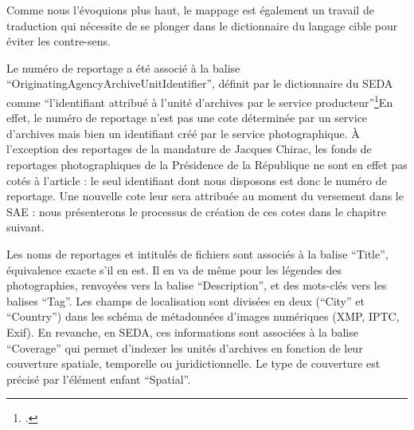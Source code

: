 Comme nous l'évoquions plus haut, le mappage est également un travail de traduction qui nécessite de se plonger dans le dictionnaire du langage cible pour éviter les contre-sens. 

Le numéro de reportage a été associé à la balise \enquote{OriginatingAgencyArchiveUnitIdentifier}, définit par le dictionnaire du SEDA comme \enquote{l'identifiant attribué à l’unité d’archives par le service producteur}\footcite{siafseda}En effet, le numéro de reportage n'est pas une cote déterminée par un service d'archives mais bien un identifiant créé par le service photographique. À l'exception des reportages de la mandature de Jacques Chirac, les fonds de reportages photographiques de la Présidence de la République ne sont en effet pas cotés à l'article : le seul identifiant dont nous disposons est donc le numéro de reportage. Une nouvelle cote leur sera attribuée au moment du versement dans le SAE : nous présenterons le processus de création de ces cotes dans le chapitre suivant.

Les noms de reportages et intitulés de fichiers sont associés à la balise \enquote{Title}, équivalence exacte s'il en est. Il en va de même pour les légendes des photographies, renvoyées vers la balise \enquote{Description}, et des mots-clés vers les balises \enquote{Tag}. Les champs de localisation sont divisées en deux (\enquote{City} et \enquote{Country}) dans les schéma de métadonnées d'images numériques (XMP, IPTC, Exif). En revanche, en SEDA, ces informations sont associées à la balise \enquote{Coverage} qui permet d'indexer les unités d'archives en fonction de leur couverture spatiale, temporelle ou juridictionnelle. Le type de couverture est précisé par l'élément enfant \enquote{Spatial}.


